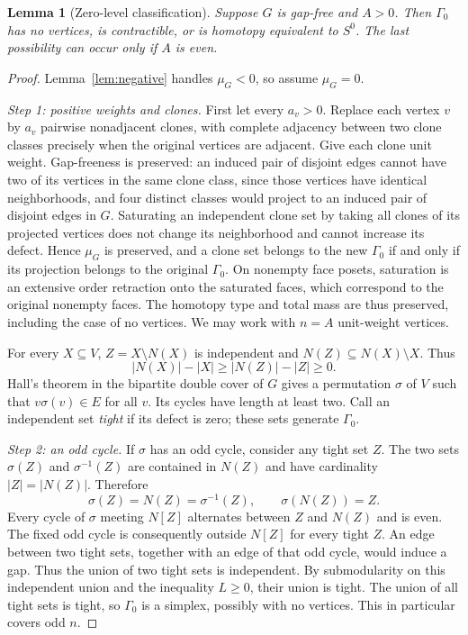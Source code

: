 \documentclass[11pt,a4paper]{article}
\newtheorem{lemma}[theorem]{Lemma}
\theoremstyle{definition}
\newcommand{\G}{\Gamma}
\begin{document}
\begin{lemma}[Zero-level classification]\label{lem:zero}
Suppose $G$ is gap-free and $A>0$. Then $\G_0$ has no vertices, is contractible, or is homotopy equivalent to $S^0$. The last possibility can occur only if $A$ is even.
\end{lemma}
\begin{proof}
Lemma~\ref{lem:negative} handles $\mu_G<0$, so assume $\mu_G=0$.

\emph{Step 1: positive weights and clones.} First let every $a_v>0$. Replace each vertex $v$ by $a_v$ pairwise nonadjacent clones, with complete adjacency between two clone classes precisely when the original vertices are adjacent. Give each clone unit weight. Gap-freeness is preserved: an induced pair of disjoint edges cannot have two of its vertices in the same clone class, since those vertices have identical neighborhoods, and four distinct classes would project to an induced pair of disjoint edges in $G$. Saturating an independent clone set by taking all clones of its projected vertices does not change its neighborhood and cannot increase its defect. Hence $\mu_G$ is preserved, and a clone set belongs to the new $\G_0$ if and only if its projection belongs to the original $\G_0$. On nonempty face posets, saturation is an extensive order retraction onto the saturated faces, which correspond to the original nonempty faces. The homotopy type and total mass are thus preserved, including the case of no vertices. We may work with $n=A$ unit-weight vertices.

For every $X\subseteq V$, $Z=X\setminus N(X)$ is independent and $N(Z)\subseteq N(X)\setminus X$. Thus
\[
 |N(X)|-|X|\geq |N(Z)|-|Z|\geq 0.
\]
Hall's theorem \cite{Hall} in the bipartite double cover of $G$ gives a permutation $\sigma$ of $V$ such that $v\sigma(v)\in E$ for all $v$. Its cycles have length at least two. Call an independent set \emph{tight} if its defect is zero; these sets generate $\G_0$.

\emph{Step 2: an odd cycle.} If $\sigma$ has an odd cycle, consider any tight set $Z$. The two sets $\sigma(Z)$ and $\sigma^{-1}(Z)$ are contained in $N(Z)$ and have cardinality $|Z|=|N(Z)|$. Therefore
\[
 \sigma(Z)=N(Z)=\sigma^{-1}(Z),\qquad \sigma(N(Z))=Z.
\]
Every cycle of $\sigma$ meeting $N[Z]$ alternates between $Z$ and $N(Z)$ and is even. The fixed odd cycle is consequently outside $N[Z]$ for every tight $Z$. An edge between two tight sets, together with an edge of that odd cycle, would induce a gap. Thus the union of two tight sets is independent. By submodularity on this independent union and the inequality $L\geq0$, their union is tight. The union of all tight sets is tight, so $\G_0$ is a simplex, possibly with no vertices. This in particular covers odd $n$.


\end{proof}
\end{document}
